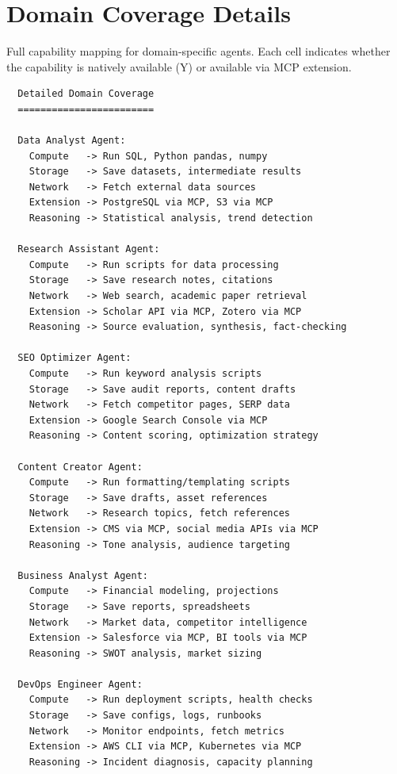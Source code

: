 \section{Domain Coverage Details}

Full capability mapping for domain-specific agents. Each cell indicates whether the capability is natively available (Y) or available via MCP extension.

\begin{verbatim}
  Detailed Domain Coverage
  ========================

  Data Analyst Agent:
    Compute   -> Run SQL, Python pandas, numpy
    Storage   -> Save datasets, intermediate results
    Network   -> Fetch external data sources
    Extension -> PostgreSQL via MCP, S3 via MCP
    Reasoning -> Statistical analysis, trend detection

  Research Assistant Agent:
    Compute   -> Run scripts for data processing
    Storage   -> Save research notes, citations
    Network   -> Web search, academic paper retrieval
    Extension -> Scholar API via MCP, Zotero via MCP
    Reasoning -> Source evaluation, synthesis, fact-checking

  SEO Optimizer Agent:
    Compute   -> Run keyword analysis scripts
    Storage   -> Save audit reports, content drafts
    Network   -> Fetch competitor pages, SERP data
    Extension -> Google Search Console via MCP
    Reasoning -> Content scoring, optimization strategy

  Content Creator Agent:
    Compute   -> Run formatting/templating scripts
    Storage   -> Save drafts, asset references
    Network   -> Research topics, fetch references
    Extension -> CMS via MCP, social media APIs via MCP
    Reasoning -> Tone analysis, audience targeting

  Business Analyst Agent:
    Compute   -> Financial modeling, projections
    Storage   -> Save reports, spreadsheets
    Network   -> Market data, competitor intelligence
    Extension -> Salesforce via MCP, BI tools via MCP
    Reasoning -> SWOT analysis, market sizing

  DevOps Engineer Agent:
    Compute   -> Run deployment scripts, health checks
    Storage   -> Save configs, logs, runbooks
    Network   -> Monitor endpoints, fetch metrics
    Extension -> AWS CLI via MCP, Kubernetes via MCP
    Reasoning -> Incident diagnosis, capacity planning
\end{verbatim}
